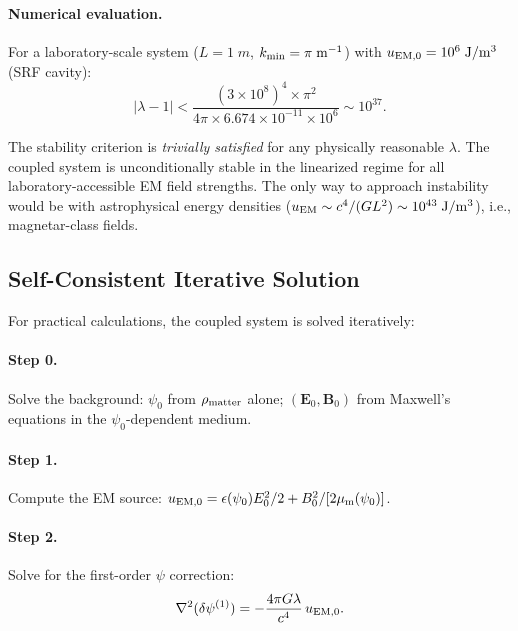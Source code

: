 \documentclass[aps,prd,twocolumn,superscriptaddress,floatfix,nofootinbib]{revtex4-2}
\newcommand{\lam}{\lambda}
\begin{document}
\paragraph{Numerical evaluation.}
For a laboratory-scale system ($L = 1\;\si{m}$,
$k_{\rm min} = \pi\;\si{m^{-1}}$) with
$u_{\rm EM,0} = 10^6\;\si{J/m^3}$ (SRF cavity):
\begin{equation}
|\lam - 1| < \frac{(3\times10^8)^4 \times \pi^2}
{4\pi \times 6.674\times10^{-11} \times 10^6}
\sim 10^{37}.
\end{equation}

The stability criterion is \emph{trivially satisfied} for any
physically reasonable $\lam$. The coupled system is unconditionally
stable in the linearized regime for all laboratory-accessible EM
field strengths. The only way to approach instability would be
with astrophysical energy densities ($u_{\rm EM} \sim c^4/(G L^2)
\sim 10^{43}\;\si{J/m^3}$), i.e., magnetar-class fields.

\subsection{Self-Consistent Iterative Solution}
\label{sec:iterative}

For practical calculations, the coupled system is solved iteratively:

\paragraph{Step 0.} Solve the background: $\psi_0$ from
$\rho_{\rm matter}$ alone; $(\mathbf{E}_0, \mathbf{B}_0)$ from
Maxwell's equations in the $\psi_0$-dependent medium.

\paragraph{Step 1.} Compute the EM source:
$u_{\rm EM,0} = \epsilon(\psi_0)E_0^2/2 + B_0^2/[2\mu_{\rm m}(\psi_0)]$.

\paragraph{Step 2.} Solve for the first-order $\psi$ correction:
\begin{equation}
\nabla^2(\delta\psi^{(1)}) = -\frac{4\pi G\lam}{c^4}\,u_{\rm EM,0}.
\end{equation}
\end{document}
